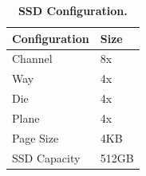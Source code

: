 \begin{table}[tb]
    \centering
    \fontsize{11}{11}
    \small
    \begin{tabular}{|p{5cm}|l|}
		\hline
		\bf{Configuration} & \bf{Size} \\ \hline \hline
        Channel & 8x \\ \hline
        Way & 4x \\ \hline
        Die & 4x \\ \hline
        Plane & 4x \\ \hline
        Page Size & 4KB \\ \hline
        SSD Capacity & 512GB \\ \hline
    \end{tabular}
    \caption{\textbf{SSD Configuration.}}
    \label{tab:ssd_config}
\end{table}
